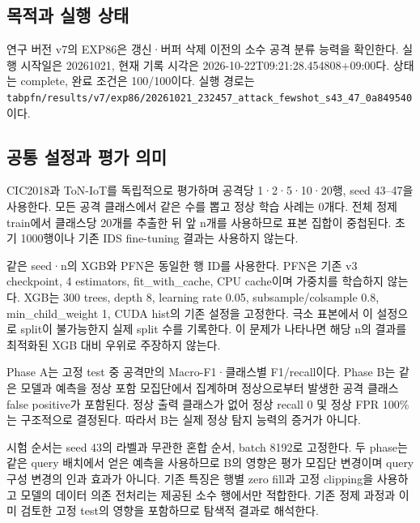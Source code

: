 

\subsection{목적과 실행 상태}
연구 버전 v7의 EXP86은 갱신·버퍼 삭제 이전의 소수 공격 분류 능력을 확인한다. 실행 시작일은 20261021, 현재 기록 시각은 2026-10-22T09:21:28.454808+\allowbreak{}09:00다. 상태는 complete, 완료 조건은 100/\allowbreak{}100이다. 실행 경로는 \texttt{tabpfn/\allowbreak{}\allowbreak{}r\allowbreak{}esults/\allowbreak{}\allowbreak{}v\allowbreak{}7/\allowbreak{}\allowbreak{}exp86/\allowbreak{}\allowbreak{}20261021\allowbreak{}\_\allowbreak{}\allowbreak{}232457\_\allowbreak{}\allowbreak{}attack\_\allowbreak{}\allowbreak{}f\allowbreak{}ewshot\_\allowbreak{}\allowbreak{}s\allowbreak{}43\_\allowbreak{}\allowbreak{}47\_\allowbreak{}\allowbreak{}0a\allowbreak{}849540}이다.

\subsection{공통 설정과 평가 의미}
CIC2018과 ToN-IoT를 독립적으로 평가하며 공격당 1·2·5·10·20행, seed 43–47을 사용한다. 모든 공격 클래스에서 같은 수를 뽑고 정상 학습 사례는 0개다. 전체 정제 train에서 클래스당 20개를 추출한 뒤 앞 n개를 사용하므로 표본 집합이 중첩된다. 초기 1000행이나 기존 IDS fine-tuning 결과는 사용하지 않는다.

같은 seed·n의 XGB와 PFN은 동일한 행 ID를 사용한다. PFN은 기존 v3 checkpoint, 4 estimators, fit\_\allowbreak{}with\_\allowbreak{}cache, CPU cache이며 가중치를 학습하지 않는다. XGB는 300 trees, depth 8, learning rate 0.05, subsample/\allowbreak{}colsample 0.8, min\_\allowbreak{}child\_\allowbreak{}weight 1, CUDA hist의 기존 설정을 고정한다. 극소 표본에서 이 설정으로 split이 불가능한지 실제 split 수를 기록한다. 이 문제가 나타나면 해당 n의 결과를 최적화된 XGB 대비 우위로 주장하지 않는다.

Phase A는 고정 test 중 공격만의 Macro-F1·클래스별 F1/\allowbreak{}recall이다. Phase B는 같은 모델과 예측을 정상 포함 모집단에서 집계하며 정상으로부터 발생한 공격 클래스 false positive가 포함된다. 정상 출력 클래스가 없어 정상 recall 0 및 정상 FPR 100\%는 구조적으로 결정된다. 따라서 B는 실제 정상 탐지 능력의 증거가 아니다.

시험 순서는 seed 43의 라벨과 무관한 혼합 순서, batch 8192로 고정한다. 두 phase는 같은 query 배치에서 얻은 예측을 사용하므로 B의 영향은 평가 모집단 변경이며 query 구성 변경의 인과 효과가 아니다. 기존 특징은 행별 zero fill과 고정 clipping을 사용하고 모델의 데이터 의존 전처리는 제공된 소수 행에서만 적합한다. 기존 정제 과정과 이미 검토한 고정 test의 영향을 포함하므로 탐색적 결과로 해석한다.

